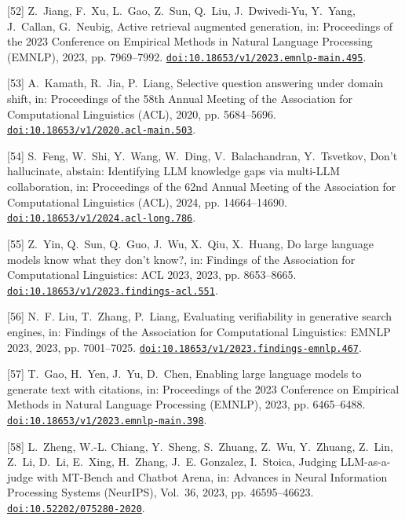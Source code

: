 [52] Z.~Jiang, F.~Xu, L.~Gao, Z.~Sun, Q.~Liu, J.~Dwivedi-Yu, Y.~Yang, J.~Callan, G.~Neubig, Active retrieval augmented generation, in: Proceedings of the 2023 Conference on Empirical Methods in Natural Language Processing ({EMNLP}), 2023, pp. 7969--7992. \href {https://doi.org/10.18653/v1/2023.emnlp-main.495} {\texttt{doi:10.18653/v1/2023.emnlp-main.495}}.

[53] A.~Kamath, R.~Jia, P.~Liang, Selective question answering under domain shift, in: Proceedings of the 58th Annual Meeting of the Association for Computational Linguistics ({ACL}), 2020, pp. 5684--5696. \href {https://doi.org/10.18653/v1/2020.acl-main.503} {\texttt{doi:10.18653/v1/2020.acl-main.503}}.

[54] S.~Feng, W.~Shi, Y.~Wang, W.~Ding, V.~Balachandran, Y.~Tsvetkov, Don't hallucinate, abstain: Identifying {LLM} knowledge gaps via multi-{LLM} collaboration, in: Proceedings of the 62nd Annual Meeting of the Association for Computational Linguistics (ACL), 2024, pp. 14664--14690. \href {https://doi.org/10.18653/v1/2024.acl-long.786} {\texttt{doi:10.18653/v1/2024.acl-long.786}}.

[55] Z.~Yin, Q.~Sun, Q.~Guo, J.~Wu, X.~Qiu, X.~Huang, Do large language models know what they don't know?, in: Findings of the Association for Computational Linguistics: ACL 2023, 2023, pp. 8653--8665. \href {https://doi.org/10.18653/v1/2023.findings-acl.551} {\texttt{doi:10.18653/v1/2023.findings-acl.551}}.

[56] N.~F. Liu, T.~Zhang, P.~Liang, Evaluating verifiability in generative search engines, in: Findings of the Association for Computational Linguistics: EMNLP 2023, 2023, pp. 7001--7025. \href {https://doi.org/10.18653/v1/2023.findings-emnlp.467} {\texttt{doi:10.18653/v1/2023.findings-emnlp.467}}.

[57] T.~Gao, H.~Yen, J.~Yu, D.~Chen, Enabling large language models to generate text with citations, in: Proceedings of the 2023 Conference on Empirical Methods in Natural Language Processing (EMNLP), 2023, pp. 6465--6488. \href {https://doi.org/10.18653/v1/2023.emnlp-main.398} {\texttt{doi:10.18653/v1/2023.emnlp-main.398}}.

[58] L.~Zheng, W.-L. Chiang, Y.~Sheng, S.~Zhuang, Z.~Wu, Y.~Zhuang, Z.~Lin, Z.~Li, D.~Li, E.~Xing, H.~Zhang, J.~E. Gonzalez, I.~Stoica, Judging {LLM}-as-a-judge with {MT-Bench} and {Chatbot Arena}, in: Advances in Neural Information Processing Systems (NeurIPS), Vol.~36, 2023, pp. 46595--46623. \href {https://doi.org/10.52202/075280-2020} {\texttt{doi:10.52202/075280-2020}}.

